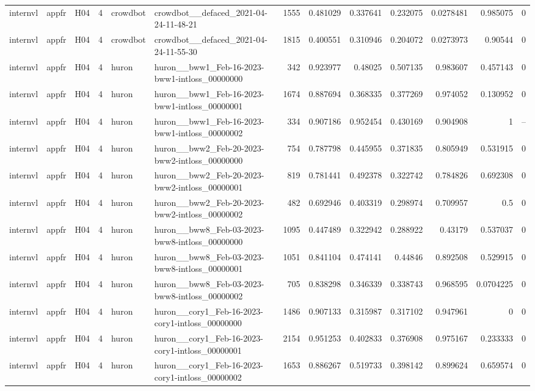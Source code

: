 \begin{longtable}{lllrllrrrrrrr}
internvl & appfr & H04 & 4 & crowdbot & crowdbot\_\_defaced\_2021-04-24-11-48-21 & 1555 & 0.481029 & 0.337641 & 0.232075 & 0.0278481 & 0.985075 & 0 \\
internvl & appfr & H04 & 4 & crowdbot & crowdbot\_\_defaced\_2021-04-24-11-55-30 & 1815 & 0.400551 & 0.310946 & 0.204072 & 0.0273973 & 0.90544 & 0 \\
internvl & appfr & H04 & 4 & huron & huron\_\_bww1\_Feb-16-2023-bww1-intloss\_00000000 & 342 & 0.923977 & 0.48025 & 0.507135 & 0.983607 & 0.457143 & 0 \\
internvl & appfr & H04 & 4 & huron & huron\_\_bww1\_Feb-16-2023-bww1-intloss\_00000001 & 1674 & 0.887694 & 0.368335 & 0.377269 & 0.974052 & 0.130952 & 0 \\
internvl & appfr & H04 & 4 & huron & huron\_\_bww1\_Feb-16-2023-bww1-intloss\_00000002 & 334 & 0.907186 & 0.952454 & 0.430169 & 0.904908 & 1 & -- \\
internvl & appfr & H04 & 4 & huron & huron\_\_bww2\_Feb-20-2023-bww2-intloss\_00000000 & 754 & 0.787798 & 0.445955 & 0.371835 & 0.805949 & 0.531915 & 0 \\
internvl & appfr & H04 & 4 & huron & huron\_\_bww2\_Feb-20-2023-bww2-intloss\_00000001 & 819 & 0.781441 & 0.492378 & 0.322742 & 0.784826 & 0.692308 & 0 \\
internvl & appfr & H04 & 4 & huron & huron\_\_bww2\_Feb-20-2023-bww2-intloss\_00000002 & 482 & 0.692946 & 0.403319 & 0.298974 & 0.709957 & 0.5 & 0 \\
internvl & appfr & H04 & 4 & huron & huron\_\_bww8\_Feb-03-2023-bww8-intloss\_00000000 & 1095 & 0.447489 & 0.322942 & 0.288922 & 0.43179 & 0.537037 & 0 \\
internvl & appfr & H04 & 4 & huron & huron\_\_bww8\_Feb-03-2023-bww8-intloss\_00000001 & 1051 & 0.841104 & 0.474141 & 0.44846 & 0.892508 & 0.529915 & 0 \\
internvl & appfr & H04 & 4 & huron & huron\_\_bww8\_Feb-03-2023-bww8-intloss\_00000002 & 705 & 0.838298 & 0.346339 & 0.338743 & 0.968595 & 0.0704225 & 0 \\
internvl & appfr & H04 & 4 & huron & huron\_\_cory1\_Feb-16-2023-cory1-intloss\_00000000 & 1486 & 0.907133 & 0.315987 & 0.317102 & 0.947961 & 0 & 0 \\
internvl & appfr & H04 & 4 & huron & huron\_\_cory1\_Feb-16-2023-cory1-intloss\_00000001 & 2154 & 0.951253 & 0.402833 & 0.376908 & 0.975167 & 0.233333 & 0 \\
internvl & appfr & H04 & 4 & huron & huron\_\_cory1\_Feb-16-2023-cory1-intloss\_00000002 & 1653 & 0.886267 & 0.519733 & 0.398142 & 0.899624 & 0.659574 & 0 \\

\end{longtable}
